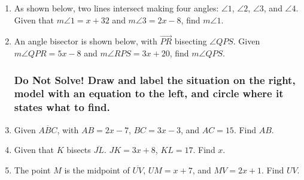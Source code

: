 \documentclass[12pt, twoside]{article}
\begin{document}
\begin{enumerate}
\item As shown below, two lines intersect making four angles: $\angle 1$, $\angle 2$, $\angle 3$, and $\angle 4$. Given that $m\angle 1= x+32$ and $m\angle 3=2x-8$, find $m\angle 1$.
  \begin{flushright}
    \end{flushright}

\item An angle bisector is shown below, with $\overrightarrow{PR}$ bisecting $\angle QPS$. Given $m\angle QPR = 5x-8$ and $m\angle RPS = 3x+20$, find $m\angle QPS$.
    \begin{flushright}
    \end{flushright}

\newpage   
  \subsubsection*{Do Not Solve! Draw and label the situation on the right, model with an equation to the left, and circle where it states what to find.}
  \vspace{0.5cm}

\item Given $\overline{ABC}$, with $AB=2x-7$, $BC=3x-3$, and $AC=15$. Find ${AB}$.
\vspace{4cm}

\item Given that $K$ bisects $\overline{JL}$. $JK=3x+8$, $KL=17$. Find ${x}$.
\vspace{4cm}

\item The point $M$ is the midpoint of $\overline{UV}$, $UM=x+7$, and $MV=2x+1$. Find ${UV}$.
\vspace{4cm}


\end{enumerate}
\end{document}
